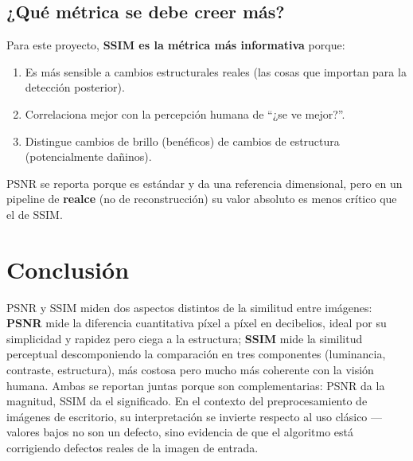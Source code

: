 \documentclass[11pt,a4paper]{article}
\begin{document}
\subsection{¿Qué métrica se debe creer más?}

Para este proyecto, \textbf{SSIM es la métrica más informativa} porque:

\begin{enumerate}
    \item Es más sensible a cambios estructurales reales (las cosas que importan
          para la detección posterior).
    \item Correlaciona mejor con la percepción humana de ``¿se ve mejor?''.
    \item Distingue cambios de brillo (benéficos) de cambios de estructura
          (potencialmente dañinos).
\end{enumerate}

PSNR se reporta porque es estándar y da una referencia dimensional, pero en un
pipeline de \textbf{realce} (no de reconstrucción) su valor absoluto es menos
crítico que el de SSIM.

\section{Conclusión}

PSNR y SSIM miden dos aspectos distintos de la similitud entre imágenes:
\textbf{PSNR} mide la diferencia cuantitativa píxel a píxel en decibelios,
ideal por su simplicidad y rapidez pero ciega a la estructura; \textbf{SSIM}
mide la similitud perceptual descomponiendo la comparación en tres componentes
(luminancia, contraste, estructura), más costosa pero mucho más coherente con
la visión humana. Ambas se reportan juntas porque son complementarias: PSNR
da la magnitud, SSIM da el significado. En el contexto del preprocesamiento
de imágenes de escritorio, su interpretación se invierte respecto al uso
clásico — valores bajos no son un defecto, sino evidencia de que el algoritmo
está corrigiendo defectos reales de la imagen de entrada.
\end{document}
